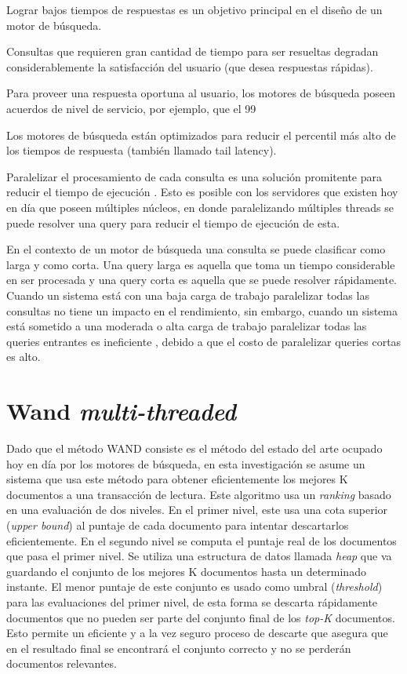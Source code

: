 Lograr bajos tiempos de respuestas es un objetivo principal en el diseño de un motor de búsqueda. 

Consultas que requieren gran cantidad de tiempo para ser resueltas degradan considerablemente la satisfacción del usuario (que desea respuestas rápidas). 


Para proveer una respuesta oportuna al usuario, los motores de búsqueda poseen acuerdos de nivel de servicio, por ejemplo, que el 99%

Los motores de búsqueda están optimizados para reducir el percentil más alto de los tiempos de respuesta (también llamado tail latency).

Paralelizar el procesamiento de cada consulta es una solución promitente para reducir el tiempo de ejecución \citep{Jeon:2013, Tatikonda:2011}. Esto es posible con los servidores que existen hoy en día que poseen múltiples núcleos, en donde paralelizando múltiples threads se puede resolver una query para reducir el tiempo de ejecución de esta. 

En el contexto de un motor de búsqueda una consulta se puede clasificar como larga y como corta. Una query larga es aquella que toma un tiempo considerable en ser procesada y una query corta es aquella que se puede resolver rápidamente. Cuando un sistema está con una baja carga de trabajo paralelizar todas las consultas no tiene un impacto en el rendimiento, sin embargo, cuando un sistema está sometido a una moderada o alta carga de trabajo paralelizar todas las queries entrantes es ineficiente  \citep{Jeon:2014}, debido a que el costo de paralelizar queries cortas es alto. 



\section{Wand \textit{multi-threaded}}
\label{scheduling:wm}
Dado que el método WAND \citep{Broder:2003} consiste es el método del estado del arte ocupado hoy en día por los motores de búsqueda, en esta investigación se asume un sistema que usa este método para obtener eficientemente los mejores K documentos a una transacción de lectura. Este algoritmo usa un \textit{ranking} basado en una evaluación de dos niveles. En el primer nivel, este usa una cota superior (\textit{upper bound}) al puntaje de cada documento para intentar descartarlos eficientemente. En el segundo nivel se computa el puntaje real de los documentos que pasa el primer nivel. Se utiliza una estructura de datos llamada \textit{heap} que va guardando el conjunto de los mejores K documentos hasta un determinado instante. El menor puntaje de este conjunto es usado como umbral (\textit{threshold}) para las evaluaciones del primer nivel, de esta forma se descarta rápidamente documentos que no pueden ser parte del conjunto final de los \textit{top-K} documentos. Esto permite un eficiente y a la vez seguro proceso de descarte que asegura que en el resultado final se encontrará el conjunto correcto y no se perderán documentos relevantes.

